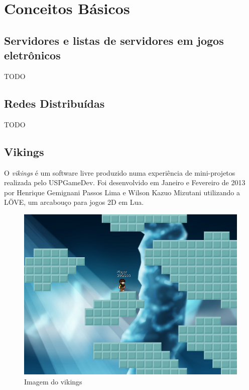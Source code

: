 \chapter{Conceitos Básicos}
\label{sec:conceitos}

\section{Servidores e listas de servidores em jogos eletrônicos}
\label{sec:conceitos:servidores}
    TODO

\section{Redes Distribuídas}
\label{sec:conceitos:redes}
    TODO

\section{Vikings}
\label{sec:conceitos:vikings}
  O \textit{vikings}\footnotemark{} é um software livre produzido numa experiência de mini-projetos realizada pelo USPGameDev\footnotemark. 
  Foi desenvolvido em Janeiro e Fevereiro de 2013 por Henrique Gemignani Passos Lima e Wilson Kazuo Mizutani 
  utilizando a LÖVE, um arcabouço para jogos 2D em Lua\footnotemark{}.
  
  \begin{figure}
    \includegraphics{imagens/vikings-1.png}
    \caption{Imagem do vikings}
  \end{figure}
  
  \addtocounter{footnote}{-3}

